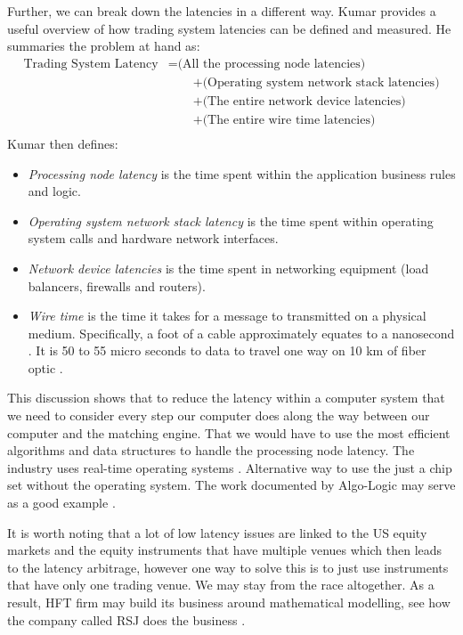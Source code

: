 \documentclass[12pt]{article}
\begin{document}
Further, we can break down the latencies in a different way. Kumar \cite{kumar} provides a useful overview of how trading system latencies can be defined and measured. He summaries the problem at hand as:
\begin{align}
\text{Trading System Latency} & = \text{(All the processing node latencies)} \nonumber \\
  & \qquad + \text{(Operating system network stack latencies)} \nonumber \\
  & \qquad + \text{(The entire network device latencies)} \nonumber \\
  & \qquad + \text{(The entire wire time latencies)} \nonumber \\
  \nonumber
\end{align}
Kumar \cite{kumar} then defines:
\begin{itemize}
\item \textit{Processing node latency} is the time spent within the application business rules and logic.
\item \textit{Operating system network stack latency} is the time spent within operating system calls and hardware network interfaces.
\item \textit{Network device latencies} is the time spent in networking equipment (load balancers, firewalls and routers).
\item \textit{Wire time} is the time it takes for a message to transmitted on a physical medium. Specifically, a foot of a cable approximately equates to a nanosecond \cite{bbc}. It is 50 to 55 micro seconds to data to travel one way on 10 km of fiber optic \cite{kumar}.
\end{itemize}
This discussion shows that to reduce the latency within a computer system that we need to consider every step our computer does along the way between our computer and the matching engine. That we would have to use the most efficient algorithms and data structures to handle the processing node latency. The industry uses real-time operating systems \cite{durbin}. Alternative way to use the just a chip set without the operating system. The work documented by Algo-Logic may serve as a good example \cite{lockwood}.

It is worth noting that a lot of low latency issues are linked to the US equity markets and the equity instruments that have multiple venues which then leads to the latency arbitrage, however one way to solve this is to just use instruments that have only one trading venue. We may stay from the race altogether. As a result, HFT firm may build its business around mathematical modelling, see how the company called RSJ does the business \cite{rsj}.
\end{document}
